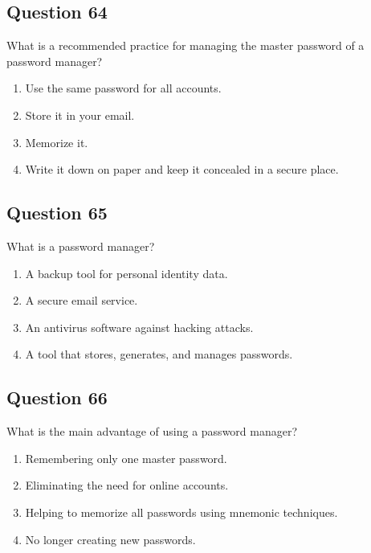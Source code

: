\documentclass[12pt,a4paper]{article}
\begin{document}
\bigskip


\subsection*{Question 64}
What is a recommended practice for managing the master password of a password manager?

\begin{enumerate}[label=\Alph*., leftmargin=*]
\item Use the same password for all accounts.
\item Store it in your email.
\item Memorize it.
\item Write it down on paper and keep it concealed in a secure place.
\end{enumerate}

\bigskip


\subsection*{Question 65}
What is a password manager?

\begin{enumerate}[label=\Alph*., leftmargin=*]
\item A backup tool for personal identity data.
\item A secure email service.
\item An antivirus software against hacking attacks.
\item A tool that stores, generates, and manages passwords.
\end{enumerate}

\bigskip


\subsection*{Question 66}
What is the main advantage of using a password manager?

\begin{enumerate}[label=\Alph*., leftmargin=*]
\item Remembering only one master password.
\item Eliminating the need for online accounts.
\item Helping to memorize all passwords using mnemonic techniques.
\item No longer creating new passwords.
\end{enumerate}

\bigskip
\end{document}
